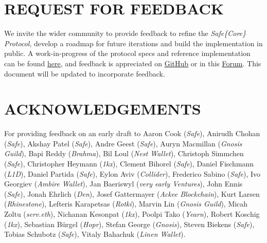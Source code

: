 \documentclass[
]{article}
\begin{document}
\hypertarget{request-for-feedback}{%
  \section{REQUEST FOR FEEDBACK}\label{request-for-feedback}}

We invite the wider community to provide feedback to refine the \emph{Safe\{Core\} Protocol}, develop a roadmap for future iterations and build the implementation in public. A work-in-progress of the protocol specs and reference implementation can be found \href{https://github.com/safe-global/safe-core-protocol-specs}{\uline{here}}, and feedback is appreciated on \href{https://github.com/safe-global/safe-core-protocol-specs/discussions}{\uline{GitHub}} or in this \href{https://forum.safe.global/}{\uline{Forum}}. This document will be updated to incorporate feedback.

\hypertarget{acknowledgements}{%
  \section{ACKNOWLEDGEMENTS}\label{acknowledgements}}

For providing feedback on an early draft to Aaron Cook (\emph{Safe}), Anirudh Chohan (\emph{Safe}), Akshay Patel (\emph{Safe}), Andre Geest (\emph{Safe}), Auryn Macmillan (\emph{Gnosis Guild}), Bapi Reddy (\emph{Brahma}), Bil Loul (\emph{Nest Wallet}), Christoph Simmchen (\emph{Safe}), Christopher Heymann (\emph{1kx}), Clement Bihorel (\emph{Safe}), Daniel Fischmann (\emph{L1D}), Daniel Partida (\emph{Safe}), Eylon Aviv (\emph{Collider}), Frederico Sabino (\emph{Safe}), Ivo Georgiev (\emph{Ambire Wallet}), Jan Baeriswyl (\emph{very early Ventures}), John Ennis (\emph{Safe}), Jonah Ehrlich (\emph{Den}), Josef Gattermayer (\emph{Ackee Blockchain}), Kurt Larsen (\emph{Rhinestone}), Lefteris Karapetsas (\emph{Rotki}), Marvin Lin (\emph{Gnosis Guild}), Micah Zoltu (\emph{serv.eth}), Nichanan Kesonpat (\emph{1kx}), Poolpi Tako (\emph{Yearn}), Robert Koschig (\emph{1kx}), Sebastian Bürgel (\emph{Hopr}), Stefan George (\emph{Gnosis}), Steven Biekens (\emph{Safe}), Tobias Schubotz (\emph{Safe}), Vitaly Bahachuk (\emph{Linen Wallet}).
\end{document}
